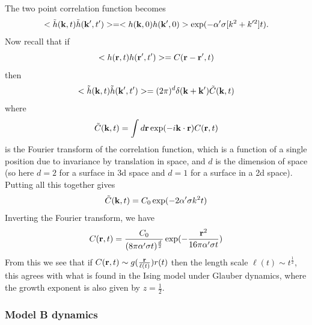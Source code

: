 The two point correlation function becomes
\begin{equation}
< \tilde h({\bf k},t)\tilde h({\bf k}',t')> = < h({\bf k},0)h({\bf k}',0)> \exp(- \alpha'\sigma[k^2+k'^2] t).
\end{equation}
Now recall that if 
\begin{equation}
< h({\bf r},t) h({\bf r}',t')> =C({\bf r}-{\bf r}',t)
\end{equation}
then
\begin{equation}
< \tilde h({\bf k},t)\tilde h({\bf k}',t')>= (2\pi)^d \delta({\bf k}+{\bf k}') \tilde C({\bf k},t)
\end{equation}
where 
\begin{equation}
\tilde C({\bf k},t)= \int d{\bf r} \exp(-i{\bf k}\cdot {\bf r})C({\bf r},t)
\end{equation}
is the Fourier transform of the correlation function, which is a function of a single position due to invariance by translation in space, and $d$ is the dimension of space (so here $d=2$ for a surface in 3d space and $d=1$ for a surface in a 2d space). Putting all this together gives
\begin{equation}
\tilde C({\bf k},t)= C_0 \exp(-2\alpha'\sigma k^2 t)
\end{equation}
Inverting the Fourier transform, we have
\begin{equation}
C({\bf r},t)= \frac{C_0}{(8\pi \alpha'\sigma t)^{\frac{d}{2}}} \exp(-\frac{{\bf r}^2}{16\pi \alpha'\sigma t})
\end{equation}
From this we see that if $C({\bf r},t)\sim g(\frac{{\bf r}}{\ell(t)})r(t)$ then the length scale $\ell(t)\sim t^{\frac{1}{2}}$, this agrees with what is found in the Ising model under Glauber dynamics, where the growth exponent is also given by $z=\frac{1}{2}$\cite{paul_domain_2005}.

\subsubsection{Model B dynamics}

